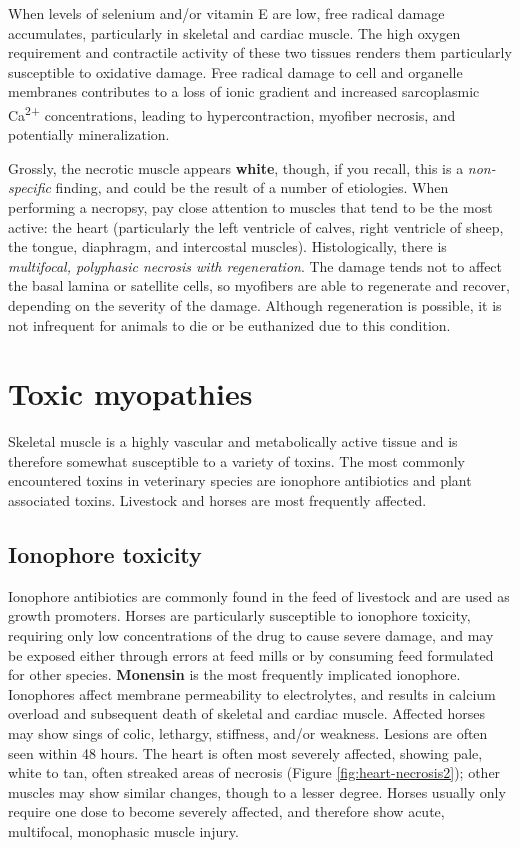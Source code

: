 \documentclass[openany]{report}
\begin{document}
When levels of selenium and/or vitamin E are low, free radical damage
accumulates, particularly in skeletal and cardiac muscle. The high
oxygen requirement and contractile activity of these two tissues renders
them particularly susceptible to oxidative damage. Free radical damage
to cell and organelle membranes contributes to a loss of ionic gradient
and increased sarcoplasmic Ca\textsuperscript{2+} concentrations,
leading to hypercontraction, myofiber necrosis, and potentially
mineralization.

Grossly, the necrotic muscle appears \textbf{white}, though, if you
recall, this is a \emph{non-specific} finding, and could be the result
of a number of etiologies. When performing a necropsy, pay close
attention to muscles that tend to be the most active: the heart
(particularly the left ventricle of calves, right ventricle of sheep,
the tongue, diaphragm, and intercostal muscles). Histologically, there
is \emph{multifocal, polyphasic necrosis with regeneration}. The damage
tends not to affect the basal lamina or satellite cells, so myofibers
are able to regenerate and recover, depending on the severity of the
damage. Although regeneration is possible, it is not infrequent for
animals to die or be euthanized due to this condition.

\chapter{Toxic myopathies}\label{toxic-myopathies}

Skeletal muscle is a highly vascular and metabolically active tissue and
is therefore somewhat susceptible to a variety of toxins. The most
commonly encountered toxins in veterinary species are ionophore
antibiotics and plant associated toxins. Livestock and horses are most
frequently affected.

\hypertarget{ionophore-toxicity}{\section{Ionophore
toxicity}\label{ionophore-toxicity}}

Ionophore antibiotics are commonly found in the feed of livestock and
are used as growth promoters. Horses are particularly susceptible to
ionophore toxicity, requiring only low concentrations of the drug to
cause severe damage, and may be exposed either through errors at feed
mills or by consuming feed formulated for other species.
\textbf{Monensin} is the most frequently implicated ionophore.
Ionophores affect membrane permeability to electrolytes, and results in
calcium overload and subsequent death of skeletal and cardiac muscle.
Affected horses may show sings of colic, lethargy, stiffness, and/or
weakness. Lesions are often seen within 48 hours. The heart is often
most severely affected, showing pale, white to tan, often streaked areas
of necrosis (Figure \ref{fig:heart-necrosis2}); other muscles may show
similar changes, though to a lesser degree. Horses usually only require
one dose to become severely affected, and therefore show acute,
multifocal, monophasic muscle injury.
\end{document}
